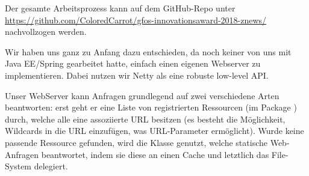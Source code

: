 Der gesamte Arbeitsprozess kann auf dem GitHub-Repo unter
\url{https://github.com/ColoredCarrot/gfos-innovationsaward-2018-znews/}
nachvollzogen werden.

Wir haben uns ganz zu Anfang dazu entschieden,
da noch keiner von uns mit Java EE/Spring gearbeitet hatte,
einfach einen eigenen Webserver zu implementieren.
Dabei nutzen wir Netty als eine robuste low-level API.

Unser WebServer kann Anfragen grundlegend auf zwei verschiedene Arten beantworten:
erst geht er eine Liste von registrierten Ressourcen
(im Package )
durch,
welche alle eine assoziierte URL besitzen
(es besteht die Möglichkeit,
Wildcards in die URL einzufügen,
was URL-Parameter ermöglicht).
Wurde keine passende Ressource gefunden,
wird die Klasse  genutzt,
welche statische Web-Anfragen beantwortet,
indem sie diese an einen Cache und letztlich das File-System delegiert.


